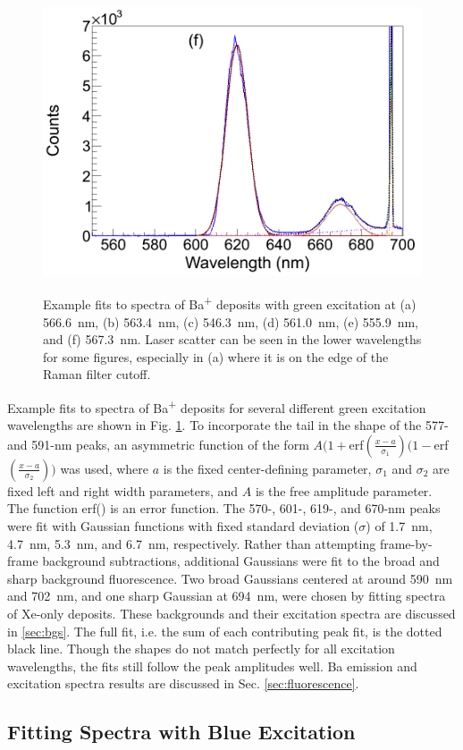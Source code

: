 \begin{figure}
                ~
                \includegraphics[width=.5\textwidth]{figures/spectra_fit_f.png}
                \caption{Example fits to spectra of Ba\textsuperscript{+} deposits with green excitation at (a) 566.6~nm, (b) 563.4~nm, (c) 546.3~nm, (d) 561.0~nm, (e) 555.9~nm, and (f) 567.3~nm.  Laser scatter can be seen in the lower wavelengths for some figures, especially in (a) where it is on the edge of the Raman filter cutoff.}
\label{fig:specFitsGrn}
\end{figure}

Example fits to spectra of Ba\textsuperscript{+} deposits for several different green excitation wavelengths are shown in Fig. \ref{fig:specFitsGrn}.  To incorporate the tail in the shape of the 577- and 591-nm peaks, an asymmetric function of the form $A(1+$erf$(\frac{x-a}{\sigma_{1}})(1-$erf$(\frac{x-a}{\sigma_{2}}))$ was used, where $a$ is the fixed center-defining parameter, $\sigma_{1}$ and $\sigma_{2}$ are fixed left and right width parameters, and $A$ is the free amplitude parameter.  The function erf() is an error function.  The 570-, 601-, 619-, and 670-nm peaks were fit with Gaussian functions with fixed standard deviation ($\sigma$) of 1.7~nm, 4.7~nm, 5.3~nm, and 6.7~nm, respectively.  Rather than attempting frame-by-frame background subtractions, additional Gaussians were fit to the broad and sharp background fluorescence.  Two broad Gaussians centered at around 590~nm and 702~nm, and one sharp Gaussian at 694~nm, were chosen by fitting spectra of Xe-only deposits.  These backgrounds and their excitation spectra are discussed in \ref{sec:bgs}.  The full fit, i.e. the sum of each contributing peak fit, is the dotted black line.  Though the shapes do not match perfectly for all excitation wavelengths, the fits still follow the peak amplitudes well.  Ba emission and excitation spectra results are discussed in Sec. \ref{sec:fluorescence}.

\subsection{Fitting Spectra with Blue Excitation}
\label{subsec:fitblu}

